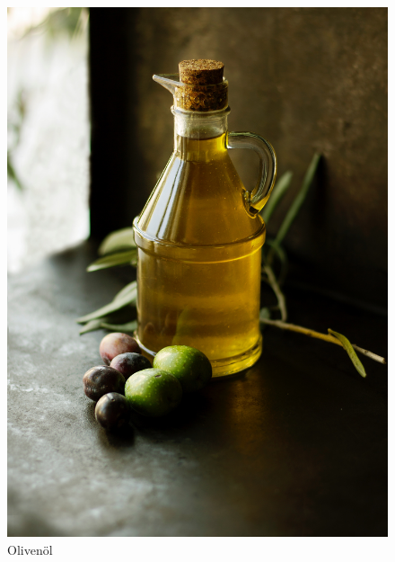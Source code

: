 \documentclass[ngerman, aspectratio=169]{beamer}
\begin{document}
\begin{frame}
\begin{columns}
    \begin{column}{0.3\textwidth}
      \begin{figure}
        \centering
        \includegraphics[width=\textwidth, height=0.8\textheight, keepaspectratio]{images/roberta-sorge-142255-unsplash.jpg}      
        \caption{Olivenöl \cite{sorge2016oil}}
        \label{fig:olvive-oil}
      \end{figure}
    \end{column}
    
  \end{columns}
\end{frame}
\end{document}
